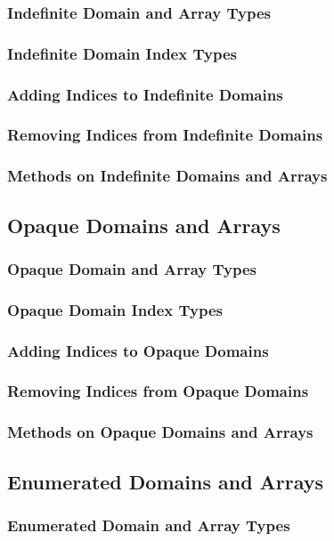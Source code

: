 \documentclass[10pt,twoside,titlepage]{article}
\begin{document}
\subsubsection{Indefinite Domain and Array Types}
\subsubsection{Indefinite Domain Index Types}
\subsubsection{Adding Indices to Indefinite Domains}
\subsubsection{Removing Indices from Indefinite Domains}
\subsubsection{Methods on Indefinite Domains and Arrays}
\subsection{Opaque Domains and Arrays}
\subsubsection{Opaque Domain and Array Types}
\subsubsection{Opaque Domain Index Types}
\subsubsection{Adding Indices to Opaque Domains}
\subsubsection{Removing Indices from Opaque Domains}
\subsubsection{Methods on Opaque Domains and Arrays}
\subsection{Enumerated Domains and Arrays}
\subsubsection{Enumerated Domain and Array Types}
\end{document}

